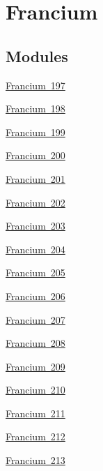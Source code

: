 \hypertarget{group___isotope_const-_francium}{}\section{Francium}
\label{group___isotope_const-_francium}
\subsection*{Modules}
\begin{DoxyCompactItemize}
\item 
\mbox{\hyperlink{group___isotope_const-_francium-_fr197}{Francium 197}}
\item 
\mbox{\hyperlink{group___isotope_const-_francium-_fr198}{Francium 198}}
\item 
\mbox{\hyperlink{group___isotope_const-_francium-_fr199}{Francium 199}}
\item 
\mbox{\hyperlink{group___isotope_const-_francium-_fr200}{Francium 200}}
\item 
\mbox{\hyperlink{group___isotope_const-_francium-_fr201}{Francium 201}}
\item 
\mbox{\hyperlink{group___isotope_const-_francium-_fr202}{Francium 202}}
\item 
\mbox{\hyperlink{group___isotope_const-_francium-_fr203}{Francium 203}}
\item 
\mbox{\hyperlink{group___isotope_const-_francium-_fr204}{Francium 204}}
\item 
\mbox{\hyperlink{group___isotope_const-_francium-_fr205}{Francium 205}}
\item 
\mbox{\hyperlink{group___isotope_const-_francium-_fr206}{Francium 206}}
\item 
\mbox{\hyperlink{group___isotope_const-_francium-_fr207}{Francium 207}}
\item 
\mbox{\hyperlink{group___isotope_const-_francium-_fr208}{Francium 208}}
\item 
\mbox{\hyperlink{group___isotope_const-_francium-_fr209}{Francium 209}}
\item 
\mbox{\hyperlink{group___isotope_const-_francium-_fr210}{Francium 210}}
\item 
\mbox{\hyperlink{group___isotope_const-_francium-_fr211}{Francium 211}}
\item 
\mbox{\hyperlink{group___isotope_const-_francium-_fr212}{Francium 212}}
\item 
\mbox{\hyperlink{group___isotope_const-_francium-_fr213}{Francium 213}}
\item 

\end{DoxyCompactItemize}
